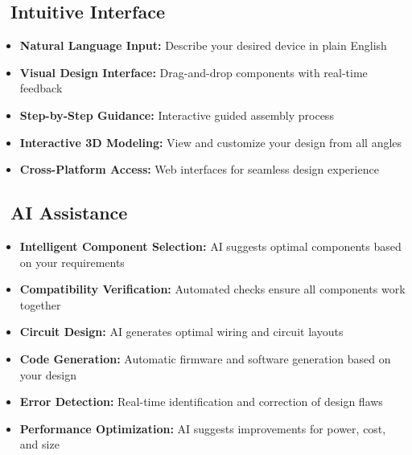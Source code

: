 \vspace{0.5cm}


\subsection*{\faDesktop\ Intuitive Interface}
\begin{itemize}[leftmargin=*]
    \item \textbf{\textcolor{fabRed}{Natural Language Input:}} Describe your desired device in plain English
    \item \textbf{\textcolor{fabRed}{Visual Design Interface:}} Drag-and-drop components with real-time feedback
    \item \textbf{\textcolor{fabRed}{Step-by-Step Guidance:}} Interactive guided assembly process
    \item \textbf{\textcolor{fabRed}{Interactive 3D Modeling:}} View and customize your design from all angles
    \item \textbf{\textcolor{fabRed}{Cross-Platform Access:}} Web interfaces for seamless design experience
\end{itemize}

\subsection*{\faCog\ AI Assistance}
\begin{itemize}[leftmargin=*]
    \item \textbf{\textcolor{fabRed}{Intelligent Component Selection:}} AI suggests optimal components based on your requirements
    \item \textbf{\textcolor{fabRed}{Compatibility Verification:}} Automated checks ensure all components work together
    \item \textbf{\textcolor{fabRed}{Circuit Design:}} AI generates optimal wiring and circuit layouts
    \item \textbf{\textcolor{fabRed}{Code Generation:}} Automatic firmware and software generation based on your design
    \item \textbf{\textcolor{fabRed}{Error Detection:}} Real-time identification and correction of design flaws
    \item \textbf{\textcolor{fabRed}{Performance Optimization:}} AI suggests improvements for power, cost, and size
\end{itemize}


